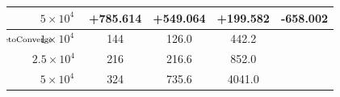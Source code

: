 \documentclass[sigconf,twocolumn,nonacm=true]{acmart}
\newcommand{\emd}{\text{\textemdash}} %
\newcommand{\e}[1]{\times10^{#1}} %
\begin{document}
\begin{figure*}[h]
\begin{adjustbox}{width=0.98\linewidth}
\begin{tabular}[c]{|c|c||c|c|c|c|}
        &$~~5\e{4}$  &\hspace*{-5pt}+785.614  &\hspace*{-5pt}+549.064   &\hspace*{-5pt}+199.582  &\hspace*{-5pt}-658.002  \\\hline
        \hline
    \multirow[c]{3}{*}{$~~\mathclap{\substack{\text{Time}\\\text{to}\\\text{Converge}}}$}
        &$~~1\e{4}$  &144  &126.0   &442.2  &\emd  \\\cline{2-6}
        &$2.5\e{4}~$ &216  &216.6   &852.0  &\emd  \\\cline{2-6}
        &$~~5\e{4}$  &324  &735.6   &\hspace*{-3.5pt}4041.0  &\emd  \\\hline
\end{tabular}
\end{adjustbox}
\end{figure*}
\end{document}
